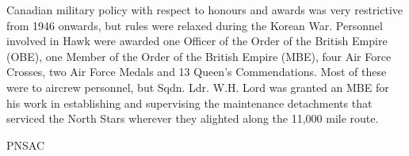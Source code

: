 Canadian military policy with respect to honours and awards was very
restrictive from 1946 onwards, but rules were relaxed during the
Korean War. Personnel involved in Hawk were awarded one Officer of the
Order of the British Empire (OBE), one Member of the Order of the
British Empire (MBE), four Air Force Crosses, two Air Force Medals and
13 Queen’s Commendations. Most of these were to aircrew personnel, but
Sqdn. Ldr. W.H. Lord was granted an MBE for his work in establishing
and supervising the maintenance detachments that serviced the North
Stars wherever they alighted along the 11,000 mile route.

\begin{footnotesize}
    \raggedleft PNSAC\\
\end{footnotesize}



